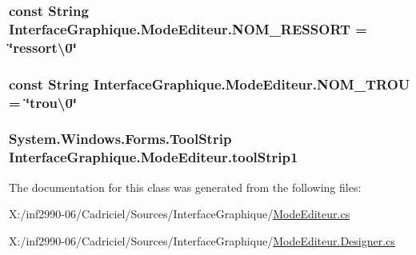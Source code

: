 \hypertarget{class_interface_graphique_1_1_mode_editeur_af7d4f3681200e7a2b054fe92f6200b3d}{
\subsubsection[{N\-O\-M\-\_\-\-R\-E\-S\-S\-O\-R\-T}]{\setlength{\rightskip}{0pt plus 5cm}const String Interface\-Graphique.\-Mode\-Editeur.\-N\-O\-M\-\_\-\-R\-E\-S\-S\-O\-R\-T = \char`\"{}ressort\textbackslash{}0\char`\"{}}}\label{class_interface_graphique_1_1_mode_editeur_af7d4f3681200e7a2b054fe92f6200b3d}
\hypertarget{class_interface_graphique_1_1_mode_editeur_a0c9ec65075e4af1fc85da53da4972e94}{
\subsubsection[{N\-O\-M\-\_\-\-T\-R\-O\-U}]{\setlength{\rightskip}{0pt plus 5cm}const String Interface\-Graphique.\-Mode\-Editeur.\-N\-O\-M\-\_\-\-T\-R\-O\-U = \char`\"{}trou\textbackslash{}0\char`\"{}}}\label{class_interface_graphique_1_1_mode_editeur_a0c9ec65075e4af1fc85da53da4972e94}
\hypertarget{class_interface_graphique_1_1_mode_editeur_af52c36ecd90fccddb88d4c1d1c596761}{
\subsubsection[{tool\-Strip1}]{\setlength{\rightskip}{0pt plus 5cm}System.\-Windows.\-Forms.\-Tool\-Strip Interface\-Graphique.\-Mode\-Editeur.\-tool\-Strip1}}\label{class_interface_graphique_1_1_mode_editeur_af52c36ecd90fccddb88d4c1d1c596761}


The documentation for this class was generated from the following files\-:\begin{DoxyCompactItemize}
\item 
X\-:/inf2990-\/06/\-Cadriciel/\-Sources/\-Interface\-Graphique/\hyperlink{_mode_editeur_8cs}{Mode\-Editeur.\-cs}\item 
X\-:/inf2990-\/06/\-Cadriciel/\-Sources/\-Interface\-Graphique/\hyperlink{_mode_editeur_8_designer_8cs}{Mode\-Editeur.\-Designer.\-cs}\end{DoxyCompactItemize}
